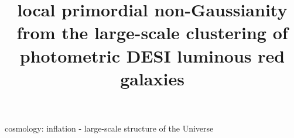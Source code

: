 \documentclass[fleqn, usenatbib]{mnras}
\title[PNG with DESI Imaging]{local primordial non-Gaussianity from the large-scale clustering of photometric DESI luminous red galaxies}
\begin{document}
\label{firstpage}
\pagerange{\pageref{firstpage}--\pageref{lastpage}}
\maketitle




\begin{keywords}
cosmology: inflation - large-scale structure of the Universe
\end{keywords}











 
\appendix


\bsp	%
\label{lastpage}
\end{document}
